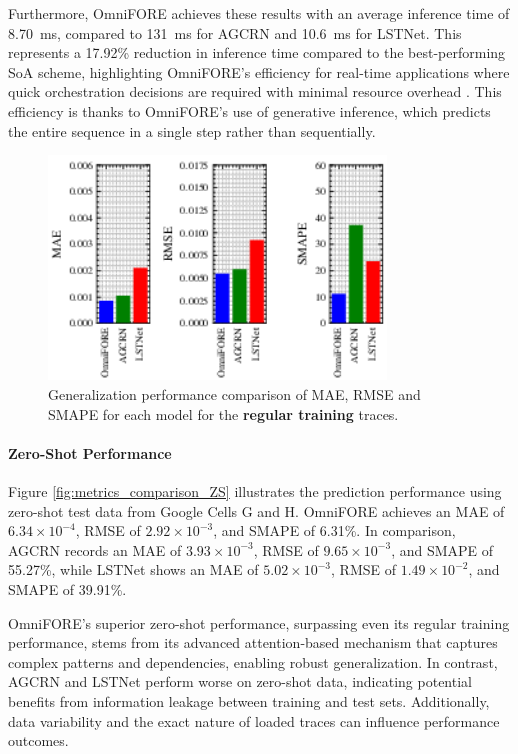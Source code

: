 \documentclass{ieeetmlcn}
\begin{document}
Furthermore, OmniFORE achieves these results with an average inference time of \SI{8.70}{\milli\second}, compared to \SI{131}{\milli\second} for AGCRN and \SI{10.6}{\milli\second} for LSTNet. This represents a 17.92\% reduction in inference time compared to the best-performing SoA scheme, highlighting OmniFORE's efficiency for real-time applications where quick orchestration decisions are required with minimal resource overhead \cite{9500858, 8334540}. This efficiency is thanks to OmniFORE's use of generative inference, which predicts the entire sequence in a single step rather than sequentially.

\begin{figure}\centering
\centering
\centering\includegraphics[width=0.8\textwidth]{img/metrics_comparison_regular.png}
\caption{Generalization performance comparison of MAE, RMSE and SMAPE for each model for the \textbf{regular training} traces.}
\label{fig:metrics_comparison_regular}
\end{figure}

\paragraph*{Zero-Shot Performance}
Figure \ref{fig:metrics_comparison_ZS} illustrates the prediction performance using zero-shot test data from Google Cells G and H. OmniFORE achieves an MAE of $6.34 \times 10^{-4}$, RMSE of $2.92 \times 10^{-3}$, and SMAPE of 6.31\%. In comparison, AGCRN records an MAE of $3.93 \times 10^{-3}$, RMSE of $9.65 \times 10^{-3}$, and SMAPE of 55.27\%, while LSTNet shows an MAE of $5.02 \times 10^{-3}$, RMSE of $1.49 \times 10^{-2}$, and SMAPE of 39.91\%.

OmniFORE's superior zero-shot performance, surpassing even its regular training performance, stems from its advanced attention-based mechanism that captures complex patterns and dependencies, enabling robust generalization. In contrast, AGCRN and LSTNet perform worse on zero-shot data, indicating potential benefits from information leakage between training and test sets. Additionally, data variability and the exact nature of loaded traces can influence performance outcomes.
\end{document}
